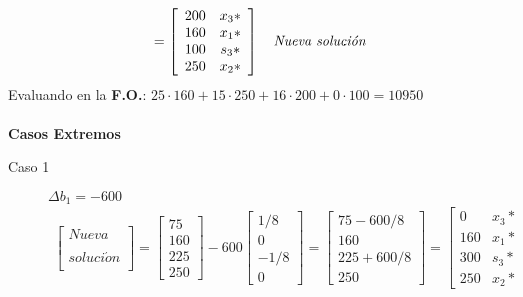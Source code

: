 \begin{enumerate}
\begin{align*}
			=
			\left[{
				\begin{array}{cc}
					200 & x_3*\\
					160 & x_1*\\
					100 & s_3*\\
					250 & x_2*	
				\end{array} 
			} \right]
			\quad \emph{Nueva solución}
		\end{align*}
		Evaluando en la \textbf{F.O.}: $25\cdot160 + 15\cdot250 + 16\cdot200 + 0\cdot100 = 10950$\\
		{\medskip}\\
		\textbf{Casos Extremos}
		\begin{description}
			\item[Caso 1] $\Delta{b_1} = -600$\\
				\begin{align*}
					\left[{
						\begin{array}{c}
								Nueva\\
							\\
							soluci\acute{o}n\\			
						\end{array} 
					} \right] 
					=
					\left[{
						\begin{array}{c}
							75\\
							160\\
							225\\
							250
						\end{array} 
					} \right] 
					-
					600
					\left[{
						\begin{array}{c}
							1/8\\
							0\\
							-1/8\\
							0	
						\end{array} 
					} \right]
					=
					\left[{
						\begin{array}{c}
							75 - 600/8\\
							160\\
							225 + 600/8\\
							250	
						\end{array} 
					} \right]
					=
					\left[{
						\begin{array}{cc}
							0 & x_3*\\
							160 & x_1*\\
							300 & s_3*\\
							250 & x_2*	
						\end{array} 
}
\end{align*}
\end{description}
\end{enumerate}
